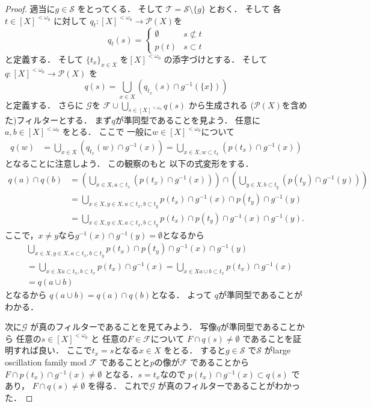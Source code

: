 \documentclass[leqno, a4paper, 12pt]{jsarticle}
\newcommand{\myfinset}[1]{[#1]^{<\omega_{0}}}
\newcommand{\myfil}[1]{\mathcal{#1}}
\newcommand{\myfam}[1]{\mathscr{#1}}
\newcommand{\mypowset}[1]{\mathcal{P}(#1)}
\begin{document}
\begin{proof}
適当に$g\in \myfam{S}$
をとってくる．
そして
$\myfam{T}=\myfam{S}\setminus \{g\}$
とおく．
そして
各$t\in \myfinset{X}$
に対して
$q_{t}\colon \myfinset{X}\to \mypowset{X}$を
\[
q_{t}(s)
=\begin{cases}
\emptyset & \textit{$s\not\subset t$}\\
p(t) & \textit{$s\subset t$}
\end{cases}
\]
と定義する．
そして
$\{t_{x}\}_{x\in X}$
を$\myfinset{X}$
の添字づけとする．
そして
$q\colon \myfinset{X}\to \mypowset{X}$
を
\[
q(s)=\bigcup_{x\in X}\left(q_{t_{x}}(s)\cap g^{-1}(\{x\})\right)
\]
と定義する．
さらに
$\myfil{G}$を
$\myfil{F}\cup \bigcup_{s\in \myfinset{X}}q(s)$
から生成される
($\mypowset{X}$を含めた)フィルターとする．
まず$q$が準同型であることを見よう．
任意に$a, b\in \myfinset{X}$
をとる．
ここで
一般に$w\in \myfinset{X}$について
\begin{align*}
q(w)&=\bigcup_{x\in X}(q_{t_{x}}(w)\cap g^{-1}(x))
=
\bigcup_{x\in X, w\subset t_{x}}(p(t_{x})\cap g^{-1}(x))
\end{align*}
となることに注意しよう．
この観察のもと
以下の式変形をする．
\begin{align*}
q(a)\cap q(b)&=
\left(\bigcup_{x\in X, a\subset t_{x}}(p(t_{x})\cap g^{-1}(x))\right)
\cap 
\left(\bigcup_{y\in X, b\subset t_{y}}(p(t_{y})\cap g^{-1}(y))\right)\\
&=
\bigcup_{x\in X, y\in X, a\subset t_{x}, b\subset t_{y}}
p(t_{x})\cap g^{-1}(x)\cap p(t_{y})\cap g^{-1}(y)\\
&=
\bigcup_{x\in X, y\in X, a\subset t_{x}, b\subset t_{y}}
p(t_{x})\cap p(t_{y})\cap g^{-1}(x)\cap g^{-1}(y). 
\end{align*}
ここで，$x\neq y$なら$g^{-1}(x)\cap g^{-1}(y)=\emptyset$となるから
\begin{align*}
&\bigcup_{x\in X, y\in X, a\subset t_{x}, b\subset t_{y}}
p(t_{x})\cap p(t_{y})\cap g^{-1}(x)\cap g^{-1}(y)\\
&=
\bigcup_{x\in X a\subset t_{x}, b\subset t_{x}}
p(t_{x})\cap g^{-1}(x)=
\bigcup_{x\in X a\cup b\subset t_{x}}
p(t_{x})\cap g^{-1}(x)\\
&=q(a\cup b)
\end{align*}
となるから
$q(a\cup b)=q(a)\cap q(b)$となる．
よって
$q$が準同型であることがわかる．


次に$\myfil{G}$
が真のフィルターであることを見てみよう．
写像$q$が準同型であることから
任意の$s\in \myfinset{X}$
と
任意の$F\in \myfil{F}$について
$F\cap q(s)\neq \emptyset$
であることを証明すれば良い．
ここで$t_{x}=s$となる$x\in X$
をとる．
すると$g\in \myfam{S}$
で$\myfam{S}$
がlarge oscillation family mod $\myfil{F}$
であることと$p$の像が$\myfil{F}$
であることから
$F\cap p(t_{x})\cap g^{-1}(x)\neq \emptyset$
となる．$s=t_{x}$なので
$p(t_{x})\cap g^{-1}(x)\subset q(s)$
であり，
$F\cap q(s)\neq \emptyset$
を得る．
これで$\myfil{G}$
が真のフィルターであることがわかった．


\end{proof}
\end{document}
